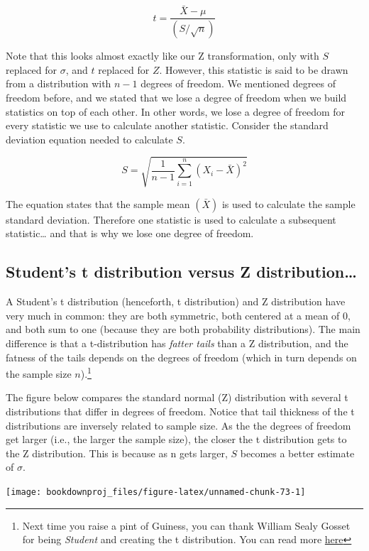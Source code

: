\documentclass[
]{book}
\begin{document}
\[t=\frac{\bar{X}-\mu}{(S/\sqrt{n})}\]

Note that this looks almost exactly like our Z transformation, only with \(S\) replaced for \(\sigma\), and \(t\) replaced for \(Z\). However, this statistic is said to be drawn from a distribution with \(n-1\) degrees of freedom. We mentioned degrees of freedom before, and we stated that we lose a degree of freedom when we build statistics on top of each other. In other words, we lose a degree of freedom for every statistic we use to calculate another statistic. Consider the standard deviation equation needed to calculate \(S\).

\[S = \sqrt{\frac{1}{n-1} \sum_{i=1}^n(X_i-\bar{X})^2}\]

The equation states that the sample mean \((\bar{X})\) is used to calculate the sample standard deviation. Therefore one statistic is used to calculate a subsequent statistic\ldots{} and that is why we lose one degree of freedom.

\hypertarget{students-t-distribution-versus-z-distribution}{%
\subsection{Student's t distribution versus Z distribution\ldots{}}\label{students-t-distribution-versus-z-distribution}}

A Student's t distribution (henceforth, t distribution) and Z distribution have very much in common: they are both symmetric, both centered at a mean of 0, and both sum to one (because they are both probability distributions). The main difference is that a t-distribution has \emph{fatter tails} than a Z distribution, and the fatness of the tails depends on the degrees of freedom (which in turn depends on the sample size \(n\)).\footnote{Next time you raise a pint of Guiness, you can thank William Sealy Gosset for being \emph{Student} and creating the t distribution. You can read more \href{https://en.wikipedia.org/wiki/William_Sealy_Gosset}{here}}

The figure below compares the standard normal (Z) distribution with several t distributions that differ in degrees of freedom. Notice that tail thickness of the t distributions are inversely related to sample size. As the the degrees of freedom get larger (i.e., the larger the sample size), the closer the t distribution gets to the Z distribution. This is because as n gets larger, \(S\) becomes a better estimate of \(\sigma\).

\begin{center}\texttt{[image: bookdownproj\_files/figure-latex/unnamed-chunk-73-1]} \end{center}
\end{document}
